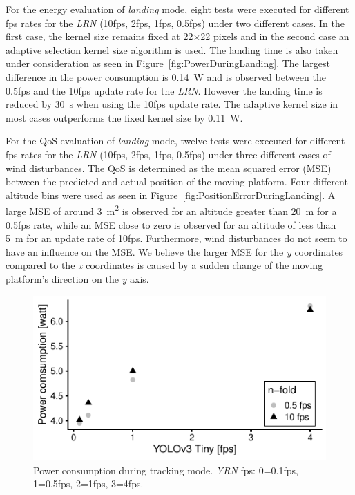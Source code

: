 \documentclass[conference]{IEEEtran}
\begin{document}
For the energy evaluation of \emph{landing} mode, eight tests were executed for different 
fps rates for the \emph{LRN}
(10fps, 2fps, 1fps, 0.5fps) under two different cases. 
In the first case, the kernel size remains fixed at 
\SI{22}{}$\times$\SI{22}{} pixels and in the second case an adaptive selection 
kernel size algorithm is used. 
%
The landing time is also taken under consideration as seen in
Figure~\ref{fig:PowerDuringLanding}. The largest difference in the
power consumption is \SI{0.14}{\watt} and is observed between the 0.5fps and
the 10fps update rate for the \emph{LRN}.
However
the landing time is reduced by \SI{30}{\second} when using the 10fps update
rate. The adaptive kernel size in most cases outperforms the fixed
kernel size by \SI{0.11}{\watt}. 

For the QoS evaluation of \emph{landing} mode, twelve tests were executed for different 
fps rates for the \emph{LRN}
(10fps, 2fps, 1fps, 0.5fps) under three different cases of wind
disturbances. The QoS is determined as the  mean squared error (MSE) 
between the predicted and actual position of the moving platform.
Four different altitude bins were used as seen in 
Figure~\ref{fig:PositionErrorDuringLanding}. 
A large MSE of around \SI{3}{\square\meter} is observed for an altitude 
greater than \SI{20}{\meter} for a 0.5fps rate, while an MSE close to 
zero is observed for an altitude of less than \SI{5}{\meter} for an 
update rate of 10fps. Furthermore, wind disturbances do not seem to 
have an influence on the MSE. We believe the larger MSE for the \emph{y} 
coordinates compared to the \emph{x} coordinates is caused by a 
sudden change of the moving platform's direction on the \emph{y} axis.

\begin{figure}[t]
  \centering
  \includegraphics{data_visualization/PowerDetection.pdf}
  \caption{Power consumption during tracking mode. \emph{YRN} fps:
    0=0.1fps, 1=0.5fps, 2=1fps, 3=4fps.}
  \label{fig:PowerDuringTracking}
\end{figure}
  
\end{document}
